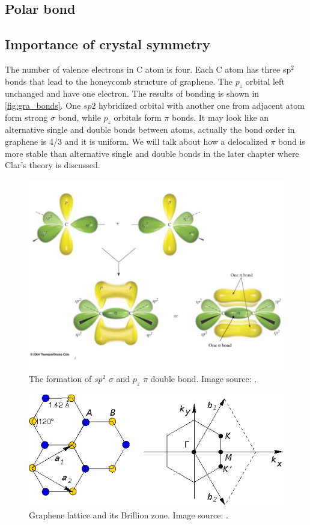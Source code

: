 \subsection{Polar bond}
\subsection{Importance of crystal symmetry}

The number of valence electrons in C atom is four. Each C atom has three sp$^2$ bonds that lead to the honeycomb structure of graphene. The $p_z$ orbital left unchanged and have one electron. The results of bonding is shown in \autoref{fig:gra_bonds}. One $sp2$ hybridized orbital with another one from adjacent atom form strong $\sigma$ bond, while $p_z$ orbitals form $\pi$ bonds. It may look like an alternative single and double bonds between atoms, actually the bond order in graphene is 4/3 and it is uniform. We will talk about how a delocalized $\pi$ bond is more stable than alternative single and double bonds in the later chapter where Clar's theory is discussed.

\begin{figure}[htbp!] 
\centering  
\includegraphics[width=\textwidth]{double_bond}
\caption{The formation of $sp^2$ $\sigma$ and $p_z$ $\pi$ double bond. Image source: \cite{gra_bond}. }  
\label{fig:gra_bonds}
\end{figure} 



\begin{figure}[htbp!] 
\centering  
\includegraphics[width=\textwidth]{gra_lat.eps}
\caption{Graphene lattice and its Brillion zone. Image source: \cite{CastroNeto2009}. }  
\label{fig:gra_lat}
\end{figure} 

